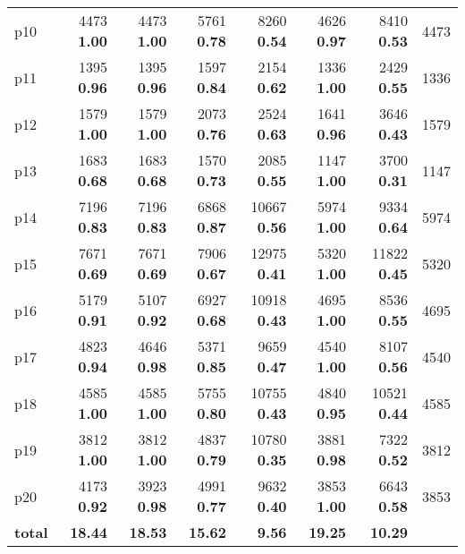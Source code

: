 \begin{tabular}{|l|rrrrrr|r|}
p10 & {\footnotesize 4473} \textbf{1.00} & {\footnotesize 4473} \textbf{1.00} & {\footnotesize 5761} \textbf{0.78} & {\footnotesize 8260} \textbf{0.54} & {\footnotesize 4626} \textbf{0.97} & {\footnotesize 8410} \textbf{0.53} & 4473\\
p11 & {\footnotesize 1395} \textbf{0.96} & {\footnotesize 1395} \textbf{0.96} & {\footnotesize 1597} \textbf{0.84} & {\footnotesize 2154} \textbf{0.62} & {\footnotesize 1336} \textbf{1.00} & {\footnotesize 2429} \textbf{0.55} & 1336\\
p12 & {\footnotesize 1579} \textbf{1.00} & {\footnotesize 1579} \textbf{1.00} & {\footnotesize 2073} \textbf{0.76} & {\footnotesize 2524} \textbf{0.63} & {\footnotesize 1641} \textbf{0.96} & {\footnotesize 3646} \textbf{0.43} & 1579\\
p13 & {\footnotesize 1683} \textbf{0.68} & {\footnotesize 1683} \textbf{0.68} & {\footnotesize 1570} \textbf{0.73} & {\footnotesize 2085} \textbf{0.55} & {\footnotesize 1147} \textbf{1.00} & {\footnotesize 3700} \textbf{0.31} & 1147\\
p14 & {\footnotesize 7196} \textbf{0.83} & {\footnotesize 7196} \textbf{0.83} & {\footnotesize 6868} \textbf{0.87} & {\footnotesize 10667} \textbf{0.56} & {\footnotesize 5974} \textbf{1.00} & {\footnotesize 9334} \textbf{0.64} & 5974\\
p15 & {\footnotesize 7671} \textbf{0.69} & {\footnotesize 7671} \textbf{0.69} & {\footnotesize 7906} \textbf{0.67} & {\footnotesize 12975} \textbf{0.41} & {\footnotesize 5320} \textbf{1.00} & {\footnotesize 11822} \textbf{0.45} & 5320\\
p16 & {\footnotesize 5179} \textbf{0.91} & {\footnotesize 5107} \textbf{0.92} & {\footnotesize 6927} \textbf{0.68} & {\footnotesize 10918} \textbf{0.43} & {\footnotesize 4695} \textbf{1.00} & {\footnotesize 8536} \textbf{0.55} & 4695\\
p17 & {\footnotesize 4823} \textbf{0.94} & {\footnotesize 4646} \textbf{0.98} & {\footnotesize 5371} \textbf{0.85} & {\footnotesize 9659} \textbf{0.47} & {\footnotesize 4540} \textbf{1.00} & {\footnotesize 8107} \textbf{0.56} & 4540\\
p18 & {\footnotesize 4585} \textbf{1.00} & {\footnotesize 4585} \textbf{1.00} & {\footnotesize 5755} \textbf{0.80} & {\footnotesize 10755} \textbf{0.43} & {\footnotesize 4840} \textbf{0.95} & {\footnotesize 10521} \textbf{0.44} & 4585\\
p19 & {\footnotesize 3812} \textbf{1.00} & {\footnotesize 3812} \textbf{1.00} & {\footnotesize 4837} \textbf{0.79} & {\footnotesize 10780} \textbf{0.35} & {\footnotesize 3881} \textbf{0.98} & {\footnotesize 7322} \textbf{0.52} & 3812\\
p20 & {\footnotesize 4173} \textbf{0.92} & {\footnotesize 3923} \textbf{0.98} & {\footnotesize 4991} \textbf{0.77} & {\footnotesize 9632} \textbf{0.40} & {\footnotesize 3853} \textbf{1.00} & {\footnotesize 6643} \textbf{0.58} & 3853\\
\hline
\textbf{total} & \textbf{18.44} & \textbf{18.53} & \textbf{15.62} & \textbf{9.56} & \textbf{19.25} & \textbf{10.29} & \\
\hline
\end{tabular}

